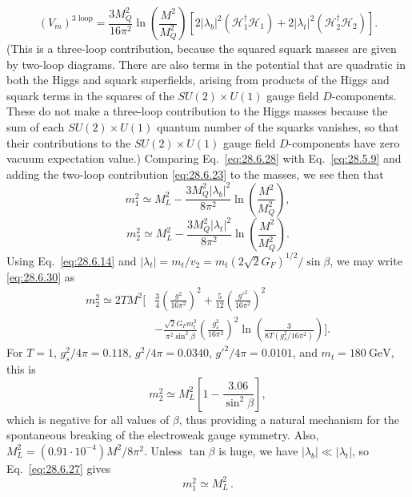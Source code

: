 \begin{equation}
  (V_m)^{\text{3 loop}}
  =\frac{3M_Q^2}{16\pi^2}\ln\left(\frac{M^2}{M_Q^2}\right)
  \left[
    2\lvert\lambda_b\rvert^2(\mathcal{H}_1^\dagger\mathcal{H}_1)
    +2\lvert\lambda_t\rvert^2(\mathcal{H}_2^\dagger\mathcal{H}_2)
  \right].
  \tag{28.6.28}\label{eq:28.6.28}
\end{equation}
(This is a three-loop contribution, because the squared squark masses are
given by two-loop diagrams. There are also terms in the potential that are
quadratic in both the Higgs and squark superfields, arising from products
of the Higgs and squark terms in the squares of the
\(SU(2)\times U(1)\) gauge field \(D\)-components. These do not
make a three-loop contribution to the Higgs masses because the sum of each
\(SU(2)\times U(1)\) quantum number of the squarks vanishes, so
that their contributions to the \(SU(2)\times U(1)\) gauge field
\(D\)-components have zero vacuum expectation value.) Comparing
Eq.~\eqref{eq:28.6.28} with Eq.~\eqref{eq:28.5.9} and adding the two-loop
contribution \eqref{eq:28.6.23} to the masses, we see then that
\begin{equation}
  m_1^2\simeq M_L^2
  -\frac{3M_Q^2\lvert\lambda_b\rvert^2}{8\pi^2}
   \ln\left(\frac{M^2}{M_Q^2}\right),
  \tag{28.6.29}\label{eq:28.6.29}
\end{equation}
\begin{equation}
  m_2^2\simeq M_L^2
  -\frac{3M_Q^2\lvert\lambda_t\rvert^2}{8\pi^2}
   \ln\left(\frac{M^2}{M_Q^2}\right).
  \tag{28.6.30}\label{eq:28.6.30}
\end{equation}
Using Eq.~\eqref{eq:28.6.14} and
\(\lvert\lambda_t\rvert=m_t/v_2
=m_t(2\sqrt{2}G_F)^{1/2}/\sin\beta\), we may write
\eqref{eq:28.6.30} as
\begin{equation}
  \begin{aligned}
    m_2^2\simeq2TM^2\Bigg[
      &\frac{3}{4}\left(\frac{g^2}{16\pi^2}\right)^2
      +\frac{5}{12}\left(\frac{g'^2}{16\pi^2}\right)^2\\
      &-\frac{\sqrt{2}G_Fm_t^2}{\pi^2\sin^2\beta}
       \left(\frac{g_s^2}{16\pi^2}\right)^2
       \ln\left(\frac{3}{8T(g_s^2/16\pi^2)}\right)
    \Bigg].
  \end{aligned}
  \tag{28.6.31}\label{eq:28.6.31}
\end{equation}
For \(T=1\), \(g_s^2/4\pi=0.118\), \(g^2/4\pi=0.0340\),
\(g'^2/4\pi=0.0101\), and \(m_t=180\ \mathrm{GeV}\), this is
\begin{equation}
  m_2^2\simeq M_L^2
  \left[1-\frac{3.06}{\sin^2\beta}\right],
  \tag{28.6.32}\label{eq:28.6.32}
\end{equation}
which is negative for all values of \(\beta\), thus providing a natural
mechanism for the spontaneous breaking of the electroweak gauge symmetry.
Also, \(M_L^2=(0.91\mathbin{\cdot}10^{-4})M^2/8\pi^2\). Unless
\(\tan\beta\) is huge, we have
\(\lvert\lambda_b\rvert\ll\lvert\lambda_t\rvert\), so
Eq.~\eqref{eq:28.6.27} gives
\begin{equation}
  m_1^2\simeq M_L^2\,.
  \tag{28.6.33}\label{eq:28.6.33}
\end{equation}

